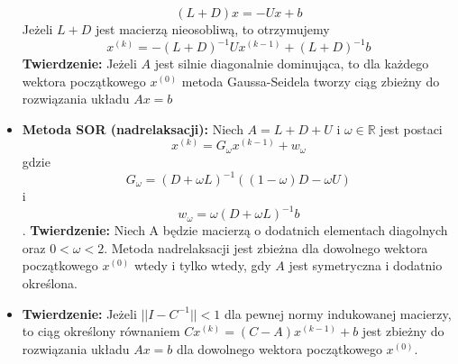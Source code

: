 \documentclass[11pt]{article}
\begin{document}
\begin{itemize}
    \[(L+D)x = -Ux + b\]
    Jeżeli $L+D$ jest macierzą nieosobliwą, to otrzymujemy
    \[x^{(k)} = -(L+D)^{-1}Ux^{(k-1)}+(L+D)^{-1}b\]
    \textbf{Twierdzenie: }Jeżeli $A$ jest silnie diagonalnie dominująca, to dla każdego wektora początkowego $x^{(0)}$ metoda Gaussa-Seidela tworzy ciąg zbieżny do rozwiązania układu $Ax = b$
    \item \textbf{Metoda SOR (nadrelaksacji): }Niech $A = L + D + U$ i $\omega \in \mathbb{R}$ jest postaci
    \[x^{(k)} = G_{\omega}x^{(k-1)} + w_{\omega}\]
    gdzie
    \[G_{\omega} = (D+\omega L)^{-1}((1-\omega)D - \omega U)\]
    i
    \[w_{\omega} = \omega(D+\omega L)^{-1}b\].
    \textbf{Twierdzenie: }Niech A będzie macierzą o dodatnich elementach diagolnych oraz $0<\omega < 2$. Metoda nadrelaksacji jest zbieżna dla dowolnego wektora początkowego $x^{(0)}$ wtedy i tylko wtedy, gdy $A$ jest symetryczna i dodatnio określona. 
    \item \textbf{Twierdzenie: }Jeżeli $||I - C^{-1}|| < 1$ dla pewnej normy indukowanej macierzy, to ciąg określony równaniem $Cx^{(k)} = (C - A)x^{(k-1)} + b$ jest zbieżny do rozwiązania układu $Ax = b$ dla dowolnego wektora początkowego $x^{(0)}$.
\end{itemize}
\end{document}
